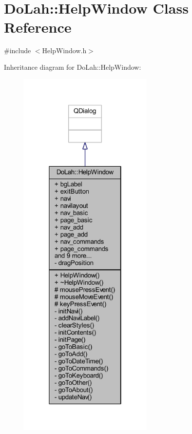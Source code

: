 \hypertarget{class_do_lah_1_1_help_window}{}\section{Do\+Lah\+:\+:Help\+Window Class Reference}
\label{class_do_lah_1_1_help_window}


{\ttfamily \#include $<$Help\+Window.\+h$>$}



Inheritance diagram for Do\+Lah\+:\+:Help\+Window\+:
\nopagebreak
\begin{figure}[H]
\begin{center}
\leavevmode
\includegraphics[width=190pt]{class_do_lah_1_1_help_window__inherit__graph}
\end{center}
\end{figure}


